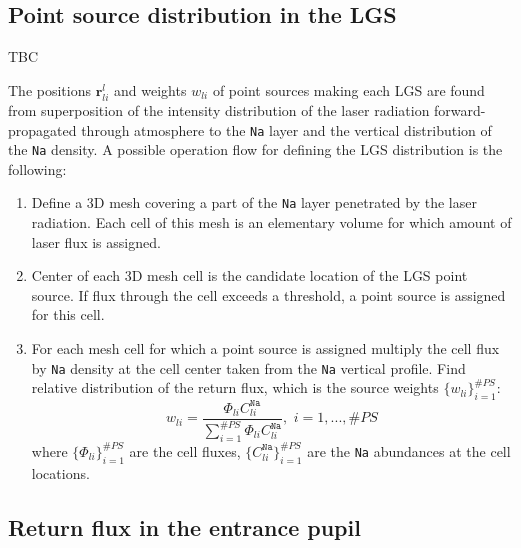 \subsection{Point source distribution in the LGS}
\label{sec:point-distribution}
TBC

The positions $\bm{r}^{l}_{li}$ and weights $w_{li}$ of point sources making
each LGS are found from superposition of the intensity distribution of the laser
radiation forward-propagated through atmosphere to the \texttt{Na} layer and
the vertical distribution of the \texttt{Na} density. A possible operation
flow for defining the LGS distribution is the following:
\begin{enumerate}
	\item Define a 3D mesh covering a part of the \texttt{Na} layer penetrated
	by the laser radiation. Each cell of this mesh is an elementary volume for
	which amount of laser flux is assigned.
	\item Center of each 3D mesh cell is the candidate location of the LGS point
	source. If flux through the cell exceeds a threshold, a point source is
	assigned for this cell.
	\item For each mesh cell for which a point source is assigned multiply the
	cell flux by \texttt{Na} density at the cell center taken from the
	\texttt{Na} vertical profile. Find relative distribution of the return flux,
	which is the source weights $\{ w_{li} \}_{i=1}^{\#PS}$:
	\begin{equation} \label{eq:source-weights}
		w_{li} = \frac{ \Phi_{li} C^{\texttt{Na}}_{li} }
		               { \sum_{i=1}^{\#PS} \Phi_{li} C^{\texttt{Na}}_{li} },
		           \,\, i = 1, ... , \#PS
	\end{equation}
	where $\{ \Phi_{li} \}_{i=1}^{\#PS}$ are the cell fluxes,
	$\{ C^{\texttt{Na}}_{li} \}_{i=1}^{\#PS}$ are the \texttt{Na} abundances at
	the cell locations.
\end{enumerate}

\subsection{Return flux in the entrance pupil}
\label{sec:return-flux}

